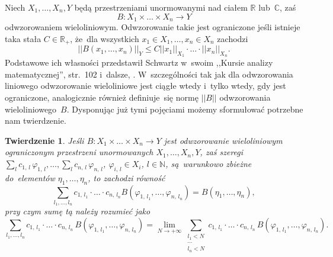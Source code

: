 \documentclass[a4paper,11pt]{article}
\newtheorem{twr}{Twierdzenie}
\newcommand{\ld}{\ldots}
\newcommand{\mb}{\mathbb}
\newcommand{\ra}{\rightarrow}
\newcommand{\wtw}{wtedy i~tylko wtedy}
\newcommand{\vp}{\varphi}
\newcommand{\N}{\mb{N}}
\newcommand{\R}{\mb{R}}
\newcommand{\C}{\mb{C}}
\newcommand{\Rp}{\R_{ + }}
\newcommand{\ti}{\times}
\newcommand{\Lim}{\lim\limits}
\newcommand{\Sum}{\sum\limits}
\newcommand{\norm}[1]{\left|\left| #1 \right|\right|}
\begin{document}
Niech $X_{ 1 }, \ld, X_{ n }, Y$ będą przestrzeniami unormowanymi nad
ciałem $\R$ lub~$\C$, zaś
\begin{equation*}
  B: X_{ 1 } \ti \ld \ti X_{ n } \ra Y
\end{equation*}
odwzorowaniem wieloliniowym. Odwzorowanie takie jest ograniczone jeśli
istnieje taka stała $C \in \Rp$, że~dla wszystkich
$x_{ 1 } \in X_{ 1 }, \ld, x_{ n } \in X_{ n }$ zachodzi
\begin{equation}
  \norm{ B( x_{ 1 }, \ld, x_{ n } ) }_{ Y } \leq C
  \norm{ x_{ 1 } }_{ X_{ 1 } } \cdot \ld \cdot \norm{ x_{ n } }_{ X_{ n } }.
\end{equation}
Podstawowe ich własności przedstawił Schwartz w~swoim ,,Kursie analizy
matematycznej'', str.~102 i~dalsze,
\cite{SchwartzKursAnalizyMatematycznej79}. W~szczególności tak jak dla
odwzorowania liniowego odwzorowanie wieloliniowe jest ciągłe \wtw, gdy
jest ograniczone, analogicznie również definiuje~się normę
$\norm{ B }$ odwzorowania wieloliniowego~$B$. Dysponując już tymi
pojęciami możemy sformułować potrzebne nam twierdzenie.

\begin{twr}
  \label{twr:OdzorowanieWielolinioweCiagle}
  Jeśli $B: X_{ 1 } \ti \ld \ti X_{ n } \ra Y$ jest odwzorowanie
  wieloliniowym ograniczonym przestrzeni unormowanych
  $X_{ 1 }, \ld, X_{ n }, Y$, zaś szeregi
  $\sum_{ l } c_{ 1, \, l } \, \vp_{ 1, \, l }, \ld, \sum_{ l } c_{ n,
    \, l } \, \vp_{ n, \, l }$, $\vp_{ i, \, l } \in X_{ i }$,
  $l \in \N$, są~warunkowo zbieżne do~elementów
  $\eta_{ 1 }, \ld, \eta_{ n }$, to zachodzi równość
  \begin{equation*}
    \Sum_{ l_{ 1 }, \ld, l_{ n } } c_{ 1, \, l_{ 1 } } \cdot \ld \cdot
    c_{ n, \, l_{ n } } B( \vp_{ 1, \, l_{ 1 } }, \ld,
    \vp_{ n, \, l_{ n } } ) = B( \eta_{ 1 }, \ld, \eta_{ n } ),
  \end{equation*}
  przy czym sumę tą należy rozumieć jako
  \begin{equation*}
    \Sum_{ l_{ 1 }, \ld, l_{ n } } c_{ 1, \, l_{ 1 } } \cdot \ld \cdot
    c_{ n, \, l_{ n } } \, B( \vp_{ 1, \, l_{ 1 } }, \ld,
    \vp_{ n, \, l_{ n } } ) = \Lim_{ N \ra +\infty }
    \Sum_{ \substack{ l_{ 1 } < N \\ \cdots \\ l_{ n } < N } }
    c_{ 1, \, l_{ 1 } } \cdot \ld \cdot c_{ n, \, l_{ n } } \,
    B( \vp_{ 1, \, l_{ 1 } }, \ld, \vp_{ n, \, l_{ n } } ).
  \end{equation*}
\end{twr}
\end{document}
